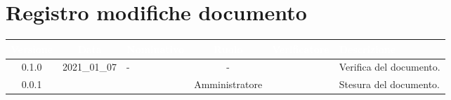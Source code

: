 \section*{Registro modifiche documento}
{
	\renewcommand{\arraystretch}{1.5}
	\centering
	\begin{longtable}{ c c C{2.3cm} c c C{5cm}}
		
		
		\textcolor{white}{\textbf{Versione}}&
		\textcolor{white}{\textbf{Data}}&
		\textcolor{white}{\textbf{Nominativo}}&
		\textcolor{white}{\textbf{Ruolo}}&
		\textcolor{white}{\textbf{Verificatore}}&
		\textcolor{white}{\textbf{Descrizione}}\\	
		\endhead
		
		0.1.0 & 2021\_01\_07 & - & - & \FF & Verifica del documento. \\
		
		0.0.1 & \Data & \PC{} & Amministratore & \FF & Stesura del documento.
		
	\end{longtable}
}